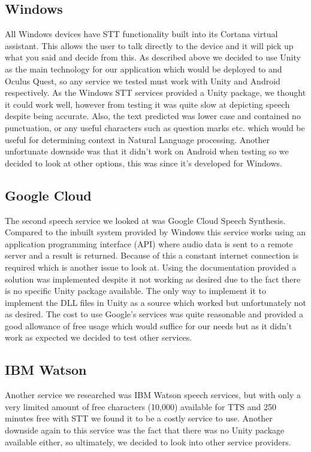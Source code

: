 \subsection{Windows}
All Windows devices have STT functionality built into its Cortana virtual assistant. This allows the user to talk directly to the device and it will pick up what you said and decide from this. As described above we decided to use Unity as the main technology for our application which would be deployed to and Oculus Quest, so any service we tested must work with Unity and Android respectively. As the Windows STT services provided a Unity package, we thought it could work well, however from testing it was quite slow at depicting speech despite being accurate. Also, the text predicted was lower case and contained no punctuation, or any useful characters such as question marks etc. which would be useful for determining context in Natural Language processing. Another unfortunate downside was that it didn't work on Android when testing so we decided to look at other options, this was since it's developed for Windows. 

\subsection{Google Cloud}
The second speech service we looked at was Google Cloud Speech Synthesis. Compared to the inbuilt system provided by Windows this service works using an application programming interface (API) where audio data is sent to a remote server and a result is returned. Because of this a constant internet connection is required which is another issue to look at. Using the documentation provided a solution was implemented despite it not working as desired due to the fact there is no specific Unity package available. The only way to implement it to implement the DLL files in Unity as a source which worked but unfortunately not as desired. The cost to use Google's services was quite reasonable and provided a good allowance of free usage which would suffice for our needs but as it didn't work as expected we decided to test other services.

\subsection{IBM Watson}
Another service we researched was IBM Watson speech services, but with only a very limited amount of free characters (10,000) available for TTS and 250 minutes free with STT we found it to be a costly service to use. Another downside again to this service was the fact that there was no Unity package available either, so ultimately, we decided to look into other service providers.


